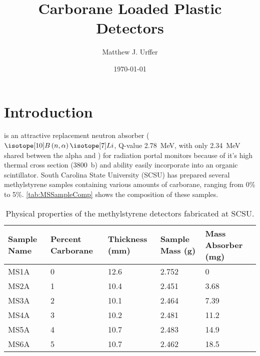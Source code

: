 \documentclass[draftcls,onecolumn]{IEEEtran}
\begin{document}
\title{Carborane Loaded Plastic Detectors}
\author{Matthew J. Urffer}
\date{\today}
\maketitle

\tableofcontents
\listoffigures
\listoftables
\section{Introduction}

 is an attractive replacement neutron absorber ($\iso[10]{B}\left( n,\alpha \right ) \iso[7]{Li}$, Q-value \SI{2.78}{\MeV}, with only \SI{2.34}{\MeV} shared between the alpha and ) for radiation portal monitors because of it's high thermal cross section (\SI{3800}{b}) and ability easily incorporate into an organic scintillator.
South Carolina State University (SCSU) has prepared several methylstyrene samples containing various amounts of carborane, ranging from 0\% to 5\%.
\autoref{tab:MSSampleComp} shows the composition of these samples.
\begin{table}[h]
\centering
\caption[Methylstyrene Detectors Physical Properties]{Physical properties of the methylstyrene detectors fabricated at SCSU.}
\label{tab:PhysicalProperties}
  \begin{tabular}{m{4cm}| m{2cm} m{2cm} m{2cm} m{2cm} }
  \toprule
     Sample Name & Percent Carborane &  Thickness (mm) & Sample Mass (g) & Mass Absorber (mg)\\
    \midrule
    MS1A & 0 & 12.6 & 2.752 & 0 \\
    MS2A & 1 & 10.4 & 2.451 & 3.68  \\
    MS3A & 2 & 10.1 & 2.464 & 7.39 \\
    MS4A & 3 & 10.2 & 2.481 & 11.2 \\
    MS5A & 4 & 10.7 & 2.483 & 14.9 \\
    MS6A & 5 & 10.7 & 2.462 & 18.5 \\
    \bottomrule
  \end{tabular}
\end{table}
\end{document}

